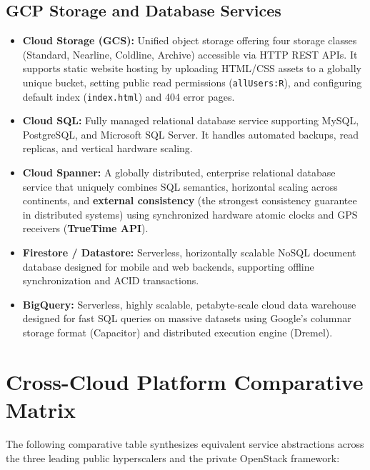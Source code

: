 \documentclass[11pt,a4paper,openany]{report}
\begin{document}
\subsection{GCP Storage and Database Services}
\begin{itemize}[leftmargin=*]
  \item \textbf{Cloud Storage (GCS):} Unified object storage offering four storage classes (Standard, Nearline, Coldline, Archive) accessible via HTTP REST APIs. It supports static website hosting by uploading HTML/CSS assets to a globally unique bucket, setting public read permissions (\texttt{allUsers:R}), and configuring default index (\texttt{index.html}) and 404 error pages.
  \item \textbf{Cloud SQL:} Fully managed relational database service supporting MySQL, PostgreSQL, and Microsoft SQL Server. It handles automated backups, read replicas, and vertical hardware scaling.
  \item \textbf{Cloud Spanner:} A globally distributed, enterprise relational database service that uniquely combines SQL semantics, horizontal scaling across continents, and \textbf{external consistency} (the strongest consistency guarantee in distributed systems) using synchronized hardware atomic clocks and GPS receivers (\textbf{TrueTime API}).
  \item \textbf{Firestore / Datastore:} Serverless, horizontally scalable NoSQL document database designed for mobile and web backends, supporting offline synchronization and ACID transactions.
  \item \textbf{BigQuery:} Serverless, highly scalable, petabyte-scale cloud data warehouse designed for fast SQL queries on massive datasets using Google's columnar storage format (Capacitor) and distributed execution engine (Dremel).
\end{itemize}

\section{Cross-Cloud Platform Comparative Matrix}
The following comparative table synthesizes equivalent service abstractions across the three leading public hyperscalers and the private OpenStack framework:
\end{document}
